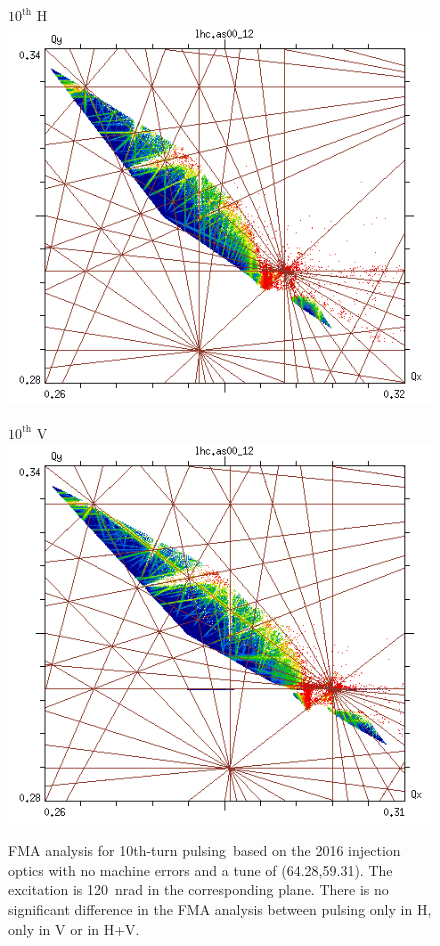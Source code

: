 \documentclass[%
 reprint,
 amsmath,amssymb,
 aps,
prstab,
longbibliography
]{revtex4-1}
\newcommand{\tenthtp}{10th-turn pulsing}
\begin{document}
\begin{figure}[h]
\begin{minipage}[t]{0.49\linewidth}
	\end{minipage}	
	\begin{minipage}[t]{0.49\linewidth}
		\centering
		$10^{\mathrm{th}}$ H
		\includegraphics[width=1.0\linewidth]{2016injnocolc15o+19_6noerrut10skh_dp0_ord10.png}
	\end{minipage}	
	\begin{minipage}[t]{0.49\linewidth}
		\centering
		$10^{\mathrm{th}}$ V
		\includegraphics[width=1.0\linewidth]{2016injnocolc15o+19_6noerrut10skv_dp0_ord10.png}
	\end{minipage}
	\caption{\label{app:fig:fma:10} FMA analysis for \tenthtp\ based on the 2016 injection optics with no machine errors and a tune of (64.28,59.31). The excitation is 120~nrad in the corresponding plane. There is no significant difference in the FMA analysis between pulsing only in H, only in V or in H+V.}
\end{figure}



\end{document}
